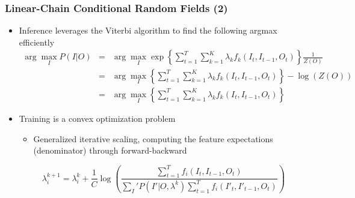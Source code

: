 \documentclass{beamer}
\begin{document}
\begin{frame}
     \frametitle{Linear-Chain Conditional Random Fields (2)}
     \begin{itemize}
     \item Inference leverages the Viterbi algorithm to find the following argmax efficiently
	 {\scriptsize \begin{eqnarray*}
         \arg \max_I P(I|O) & = &  \arg \max_I \exp\left\{\sum_{t=1}^T \sum_{k=1}^K\lambda_kf_k(I_t, I_{t-1}, O_t)\right\} \frac{1}{Z(O)} \\
		                    & = & \arg \max_I \left\{\sum_{t=1}^T \sum_{k=1}^K\lambda_kf_k(I_t, I_{t-1}, O_t)\right\} - \log \left( Z(O) \right) \\
							& = & \arg \max_I \left\{\sum_{t=1}^T \sum_{k=1}^K\lambda_kf_k(I_t, I_{t-1}, O_t)\right\} 
     \end{eqnarray*}}
	 \item Training is a convex optimization problem
	 \begin{itemize}
	 \scriptsize
	 \item Generalized iterative scaling, computing the feature expectations (denominator) through forward-backward
	 \end{itemize}
	 {\scriptsize \begin{displaymath}
     \lambda_i^{k+1} = 
      \lambda_i^k + 
      \frac{1}{C} \log\left(
      \frac{ \sum_{t=1}^T f_i(I_t, I_{t-1}, O_t)  }
           { \sum_I' P(I'|O,\lambda^{k}) \sum_{t=1}^T f_i(I'_t, I'_{t-1}, O_t) }  
	   \right)
	 \end{displaymath}}
     \end{itemize}
\end{frame}




\end{document}
